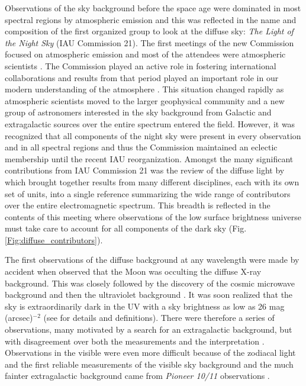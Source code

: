 \documentclass{iau}
\begin{document}
Observations of the sky background before the space age were dominated in most spectral regions by atmospheric emission and this was reflected in the name and composition of the first organized group to look at the diffuse sky: \textit{The Light of the Night Sky} (IAU Commission 21). The first meetings of the new Commission focused on atmospheric emission and most of the attendees were atmospheric scientists \citep{MurthyIAU}. The Commission played an active role in fostering international collaborations and results from that period played an important role in our modern understanding of the atmosphere \citep{Meier1991}. This situation changed rapidly as atmospheric scientists moved to the larger geophysical community and a new group of astronomers interested in the sky background from Galactic and extragalactic sources over the entire spectrum entered the field. However, it was recognized that all components of the night sky were present in every observation and in all spectral regions and thus the Commission maintained an eclectic membership until the recent IAU reorganization. Amongst the many significant contributions from IAU Commission 21 was the review of the diffuse light by \cite{Leinert1998} which brought together results from many different disciplines, each with its own set of units, into a single reference summarizing the wide range of contributors over the entire electromagnetic spectrum. This breadth is reflected in the contents of this meeting where observations of the low surface brightness universe must take care to account for all components of the dark sky (Fig. \ref{Fig:diffuse_contributors}).

The first observations of the diffuse background at any wavelength were made by accident when \cite{Giacconi1962} observed that the Moon was occulting the diffuse X-ray background. This was closely followed by the discovery of the cosmic microwave background \citep{Penzias1965} and then the ultraviolet background  \citep{Hayakawa1969, Lillie1976}. It was soon realized that the sky is extraordinarily dark in the UV with a sky brightness as low as 26 mag (arcsec)$^{-2}$ (see \citet{oconnell1987} for details and definitions). There were therefore a series of observations, many motivated by a search for an extragalactic background, but with disagreement over both the measurements and the interpretation \citep{Bowyer1991, Henry1991}. Observations in the visible were even more difficult because of the zodiacal light and the first reliable measurements of the visible sky background and the much fainter extragalactic background came from {\it Pioneer 10/11} observations \citep{Toller_EBL}.
\end{document}
